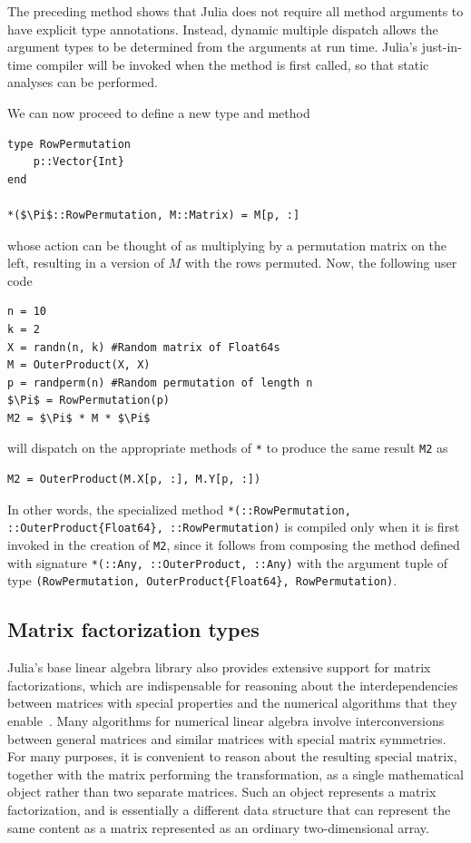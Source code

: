 \documentclass[10pt, preprint]{sigplanconf}
\begin{document}
The preceding method shows that Julia does not require all method arguments to
have explicit type annotations. Instead, dynamic multiple dispatch allows the
argument types to be determined from the arguments at run time.
Julia's just-in-time compiler will be invoked when the method is first
called, so that static analyses can be performed.

We can now proceed to define a new type and method

\begin{lstlisting}
type RowPermutation
	p::Vector{Int}
end

*($\Pi$::RowPermutation, M::Matrix) = M[p, :]
\end{lstlisting}
%
whose action can be thought of as multiplying by a permutation matrix on the
left, resulting in a version of $M$ with the rows permuted. Now, the following
user code
%
\begin{lstlisting}
n = 10
k = 2
X = randn(n, k) #Random matrix of Float64s
M = OuterProduct(X, X)
p = randperm(n) #Random permutation of length n
$\Pi$ = RowPermutation(p)
M2 = $\Pi$ * M * $\Pi$
\end{lstlisting}
%
will dispatch on the appropriate methods of \lstinline|*| to produce the same
result \lstinline|M2| as
\begin{lstlisting}
M2 = OuterProduct(M.X[p, :], M.Y[p, :])
\end{lstlisting}
%
In other words, the specialized method
\lstinline|*(::RowPermutation, ::OuterProduct{Float64}, ::RowPermutation)|
is compiled only when it is first invoked in the creation of
\lstinline|M2|, since it follows from composing the method defined with
signature \lstinline|*(::Any, ::OuterProduct, ::Any)| with the argument tuple
of type \lstinline|(RowPermutation, OuterProduct{Float64}, RowPermutation)|.

\subsection{Matrix factorization types}

Julia's base linear algebra library also provides extensive support for matrix
factorizations, which are indispensable for reasoning about the
interdependencies between matrices with special properties and the numerical
algorithms that they enable~\cite{Golub1996}. Many algorithms for numerical
linear algebra involve interconversions between general matrices and similar
matrices with special matrix symmetries. For many purposes, it is convenient to
reason about the resulting special matrix, together with the matrix performing
the transformation, as a single mathematical object rather than two separate
matrices. Such an object represents a matrix factorization, and is essentially
a different data structure that can represent the same content as a matrix
represented as an ordinary two-dimensional array.
\end{document}
